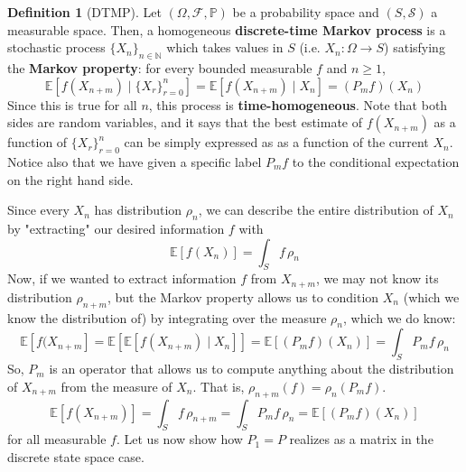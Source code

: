\documentclass{article}
\theoremstyle{definition}
\theoremstyle{remark}
\theoremstyle{definition}
\newtheorem{definition}{Definition}[section]
\begin{document}
\begin{definition}[DTMP]
Let $(\Omega, \mathcal{F}, \mathbb{P})$ be a probability space and $(S, \mathcal{S})$ a measurable space. Then, a homogeneous \textbf{discrete-time Markov process} is a stochastic process $\{X_n\}_{n \in \mathbb{N}}$ which takes values in $S$ (i.e. $X_n: \Omega \rightarrow S$) satisfying the \textbf{Markov property}: for every bounded measurable $f$ and $n \geq 1$, 
\[\mathbb{E}[f(X_{n + m}) \mid \{X_r\}_{r=0}^n] = \mathbb{E}[f (X_{n + m}) \mid X_n] = (P_m f) (X_n)\]
Since this is true for all $n$, this process is \textbf{time-homogeneous}. Note that both sides are random variables, and it says that the best estimate of $f(X_{n+m})$ as a function of $\{X_r\}_{r=0}^n$ can be simply expressed as as a function of the current $X_n$. Notice also that we have given a specific label $P_m f$ to the conditional expectation on the right hand side. 
\end{definition}

Since every $X_n$ has distribution $\rho_n$, we can describe the entire distribution of $X_n$ by "extracting" our desired information $f$ with 
\[\mathbb{E}[f(X_n)] = \int_S f \, \rho_n\]
Now, if we wanted to extract information $f$ from $X_{n + m}$, we may not know its distribution $\rho_{n + m}$, but the Markov property allows us to condition $X_n$ (which we know the distribution of) by integrating over the measure $\rho_n$, which we do know: 
\[\mathbb{E}[f(X_{n + m}] = \mathbb{E}[ \mathbb{E}[f(X_{n + m}) \mid X_n]] = \mathbb{E}[(P_m f) (X_n)] = \int_S P_m f \, \rho_n\]
So, $P_m$ is an operator that allows us to compute anything about the distribution of $X_{n + m}$ from the measure of $X_n$. That is, $\rho_{n + m} (f) = \rho_n (P_m f)$. 
\[\mathbb{E}[f(X_{n + m})] = \int_S f \, \rho_{n + m} = \int_S P_m f \, \rho_n = \mathbb{E}[ (P_m f) (X_n)]\] 
for all measurable $f$. Let us now show how $P_1 = P$ realizes as a matrix in the discrete state space case. 
\end{document}
